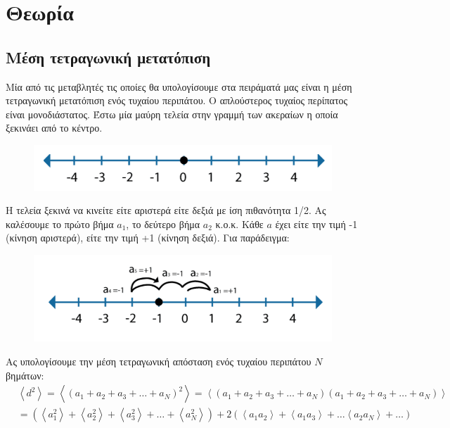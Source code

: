 \chapter{Θεωρία}
\section{Μέση τετραγωνική μετατόπιση}
Μία από τις μεταβλητές τις οποίες θα υπολογίσουμε στα πειράματά μας είναι η μέση τετραγωνική μετατόπιση ενός τυχαίου περιπάτου. 
Ο απλούστερος τυχαίος περίπατος είναι μονοδιάστατος. Έστω μία μαύρη τελεία στην γραμμή των ακεραίων η οποία ξεκινάει από το κέντρο. 
\begin{figure}[H]
\begin{center}
\includegraphics[scale=0.9]{figures/TheoryRW1.png}
\end{center}
\end{figure}
\noindent
Η τελεία ξεκινά να κινείτε είτε αριστερά είτε δεξιά με ίση πιθανότητα 1/2. Ας καλέσουμε το πρώτο βήμα $a_1$, το δεύτερο βήμα $a_2$ κ.ο.κ. Κάθε $a$ έχει είτε την τιμή -1 (κίνηση αριστερά), είτε την τιμή +1 (κίνηση δεξιά).
Για παράδειγμα: 
\begin{figure}[H]
\begin{center}
\includegraphics[scale=0.9]{figures/TheoryRW2.png}
\end{center}
\end{figure}
\noindent
Ας υπολογίσουμε την μέση τετραγωνική απόσταση ενός τυχαίου περιπάτου $N$ βημάτων:
\begin{equation}
\begin{aligned}
&\left\langle d^{2}\right\rangle=\left\langle\left(a_{1}+a_{2}+a_{3}+\ldots+a_{N}\right)^{2}\right\rangle=\left\langle\left(a_{1}+a_{2}+a_{3}+\ldots+a_{N}\right)\left(a_{1}+a_{2}+a_{3}+\ldots+a_{N}\right)\right\rangle\\
&=\left(\left\langle a_{1}^{2}\right\rangle+\left\langle a_{2}^{2}\right\rangle+\left\langle a_{3}^{2}\right\rangle+\ldots+\left\langle a_{N}^{2}\right\rangle\right)+2\left(\left\langle a_{1} a_{2}\right\rangle+\left\langle a_{1} a_{3}\right\rangle+\ldots\left\langle a_{2} a_{N}\right\rangle+\ldots\right)
\end{aligned}
\label{msd}
\end{equation}
